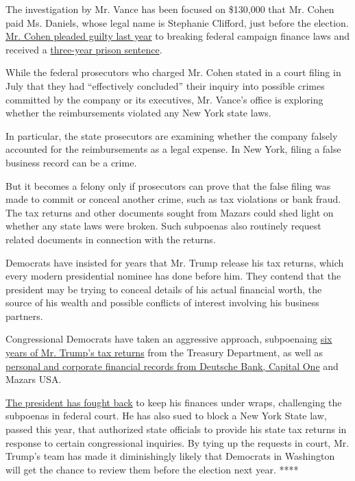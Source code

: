 The investigation by Mr. Vance has been focused on \$130,000 that Mr.
Cohen paid Ms. Daniels, whose legal name is Stephanie Clifford, just
before the election.
\href{https://www.nytimes3xbfgragh.onion/2018/08/21/nyregion/michael-cohen-plea-deal-trump.html}{Mr.
Cohen pleaded guilty last year} to breaking federal campaign finance
laws and received a
\href{https://www.nytimes3xbfgragh.onion/2018/12/12/nyregion/michael-cohen-sentence-trump.html}{three-year
prison sentence}.

While the federal prosecutors who charged Mr. Cohen stated in a court
filing in July that they had ``effectively concluded'' their inquiry
into possible crimes committed by the company or its executives, Mr.
Vance's office is exploring whether the reimbursements violated any New
York state laws.

In particular, the state prosecutors are examining whether the company
falsely accounted for the reimbursements as a legal expense. In New
York, filing a false business record can be a crime.

But it becomes a felony only if prosecutors can prove that the false
filing was made to commit or conceal another crime, such as tax
violations or bank fraud. The tax returns and other documents sought
from Mazars could shed light on whether any state laws were broken. Such
subpoenas also routinely request related documents in connection with
the returns.

Democrats have insisted for years that Mr. Trump release his tax
returns, which every modern presidential nominee has done before him.
They contend that the president may be trying to conceal details of his
actual financial worth, the source of his wealth and possible conflicts
of interest involving his business partners.

Congressional Democrats have taken an aggressive approach, subpoenaing
\href{https://www.nytimes3xbfgragh.onion/2019/04/03/us/politics/mueller-report-subpoena-house.html}{six
years of Mr. Trump's tax returns} from the Treasury Department, as well
as
\href{https://www.nytimes3xbfgragh.onion/2019/05/22/business/deutsche-bank-trump-subpoena.html}{personal
and corporate financial records from Deutsche Bank, Capital One} and
Mazars USA.

\href{https://www.nytimes3xbfgragh.onion/2019/08/13/us/politics/trump-house-lawsuits.html}{The
president has fought back} to keep his finances under wraps, challenging
the subpoenas in federal court. He has also sued to block a New York
State law, passed this year, that authorized state officials to provide
his state tax returns in response to certain congressional inquiries. By
tying up the requests in court, Mr. Trump's team has made it
diminishingly likely that Democrats in Washington will get the chance to
review them before the election next year. ****

